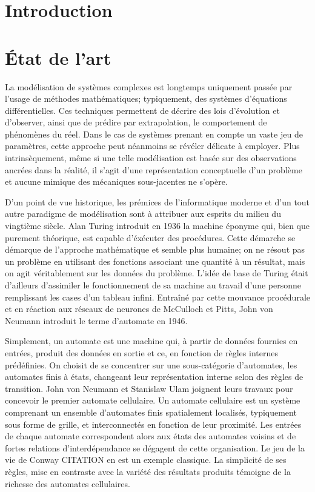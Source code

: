 \documentclass[10pt]{article}
\begin{document}
\begin{multicols}{2}

\section{Introduction}

\section{\'Etat de l'art}

La modélisation de systèmes complexes est longtemps uniquement passée
par l'usage de méthodes mathématiques; typiquement, des systèmes
d'équations différentielles. Ces techniques permettent de décrire des
lois d'évolution et d'observer, ainsi que de prédire par
extrapolation, le comportement de phénomènes du réel. Dans le cas de
systèmes prenant en compte un vaste jeu de paramètres, cette approche
peut néanmoins se révéler délicate à employer. Plus intrinsèquement,
même si une telle modélisation est basée sur des observations ancrées
dans la réalité, il s'agit d'une représentation conceptuelle d'un
problème et aucune mimique des mécaniques sous-jacentes ne s'opère.

D'un point de vue historique, les prémices de l'informatique moderne
et d'un tout autre paradigme de modélisation sont à attribuer aux
esprits du milieu du vingtième siècle. Alan Turing introduit en 1936
la machine éponyme qui, bien que purement théorique, est capable
d'éxécuter des procédures. Cette démarche se démarque de l'approche
mathématique et semble plus humaine; on ne résout pas un problème en
utilisant des fonctions associant une quantité à un résultat, mais on
agit véritablement sur les données du problème. L'idée de base de
Turing était d'ailleurs d'assimiler le fonctionnement de sa machine au
travail d'une personne remplissant les cases d'un tableau
infini. Entraîné par cette mouvance procédurale et en réaction aux
réseaux de neurones de McCulloch et Pitts, John von Neumann introduit
le terme d'automate en 1946.

Simplement, un automate est une machine qui, à partir de données
fournies en entrées, produit des données en sortie et ce, en fonction
de règles internes prédéfinies. On choisit de se concentrer sur une
sous-catégorie d'automates, les automates finis à états, changeant
leur représentation interne selon des règles de transition. John von
Neumann et Stanislaw Ulam joignent leurs travaux pour concevoir le
premier automate cellulaire. Un automate cellulaire est un système
comprenant un ensemble d'automates finis spatialement localisés,
typiquement sous forme de grille, et interconnectés en fonction de
leur proximité. Les entrées de chaque automate correspondent alors aux
états des automates voisins et de fortes relations d'interdépendance
se dégagent de cette organisation. Le jeu de la vie de Conway CITATION
en est un exemple classique. La simplicité de ses règles, mise en
contraste avec la variété des résultats produits témoigne de la
richesse des automates cellulaires.


\end{multicols}
\end{document}

